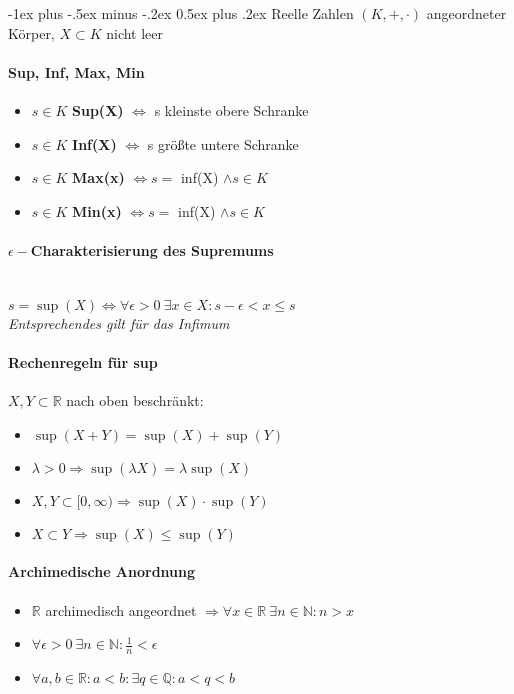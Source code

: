 \documentclass[paper=a3,paper=landscape, fontsize=9pt,DIV=30]{scrartcl}
\makeatletter
\newcommand{\real}{{\mathbb{R}}}
\newcommand{\nat}{\mathbb{N}}
\renewcommand{\section}{\@startsection{section}{1}{0mm}%
  {-1ex plus -.5ex minus -.2ex}%
  {0.5ex plus .2ex}%
  {\color{blue}\normalfont\large\bfseries}}
\makeatother
\begin{document}
\begin{multicols*}{4}

	\section{Reelle Zahlen}
	$(K,+,\cdot)$ angeordneter Körper, $X \subset K$ nicht leer
	\paragraph{Sup, Inf, Max, Min}
	\begin{itemize}
		\item $s \in K$ \textbf{Sup(X)} $\Leftrightarrow$ s kleinste obere Schranke
		\item $s \in K$ \textbf{Inf(X)} $\Leftrightarrow$ s größte untere Schranke
		\item $s \in K$ \textbf{Max(x)} $\Leftrightarrow s =$ inf(X) $\wedge s \in K$
		\item $s \in K$ \textbf{Min(x)} $\Leftrightarrow s =$ inf(X) $\wedge s \in K$
	\end{itemize}
	\paragraph{$\epsilon-$Charakterisierung des Supremums}\hspace{0pt}\\
	$s = \sup(X) \Leftrightarrow\forall \epsilon > 0 \ \exists x \in X: s-\epsilon < x \leq s$\\
	\textit{Entsprechendes gilt für das Infimum}
	\paragraph{Rechenregeln für sup}
	$X,Y \subset \real$ nach oben beschränkt:
	\begin{itemize}
		\item $\sup(X+Y) = \sup(X) + \sup(Y)$
		\item $\lambda > 0 \Rightarrow \sup(\lambda X) = \lambda \sup(X)$
		\item $X,Y \subset [0,\infty) \Rightarrow \sup(X) \cdot \sup(Y)$
		\item $X \subset Y \Rightarrow \sup(X) \leq \sup(Y)$
	\end{itemize}
\paragraph{Archimedische Anordnung}
\begin{itemize}
	\item $\real$ archimedisch angeordnet $\Rightarrow \forall x \in \real \ \exists n \in \nat: n > x$
	\item $\forall \epsilon > 0 \ \exists n \in \nat: \frac{1}{n} < \epsilon$
	\item $\forall a,b \in \real: a < b: \exists q \in \mathbb{Q}: a<q<b$
\end{itemize}


\end{multicols*}
\end{document}
